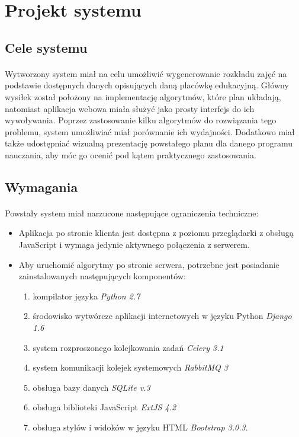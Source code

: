 \section{Projekt systemu}
\author{Filip Czajkowski}
\subsection{Cele systemu}
\paragraph{}Wytworzony system miał na celu umożliwić wygenerowanie rozkładu zajęć na podstawie dostępnych danych opisujących daną placówkę edukacyjną. Główny wysiłek został położony na implementację algorytmów, które plan układają, natomiast aplikacja webowa miała służyć jako prosty interfejs do ich wywoływania. Poprzez zastosowanie kilku algorytmów do rozwiązania tego problemu, system umożliwiać miał porównanie ich wydajności. Dodatkowo miał także udostępniać wizualną prezentację powstałego planu dla danego programu nauczania, aby móc go ocenić pod kątem praktycznego zastosowania.
\subsection{Wymagania}
\paragraph{}Powstały system miał narzucone następujące ograniczenia techniczne:
\begin{itemize}
\item Aplikacja po stronie klienta jest dostępna z poziomu przeglądarki z obsługą JavaScript i wymaga jedynie aktywnego połączenia z serwerem.
\item Aby uruchomić algorytmy po stronie serwera, potrzebne jest posiadanie zainstalowanych następujących komponentów:
\begin{enumerate}
\item kompilator języka \emph{Python 2.7}
\item środowisko wytwórcze aplikacji internetowych w języku Python \emph{Django 1.6}
\item system rozproszonego kolejkowania zadań \emph{Celery 3.1}
\item system komunikacji kolejek systemowych \emph{RabbitMQ 3}
\item obsługa bazy danych \emph{SQLite v.3}
\item obsługa biblioteki JavaScript \emph{ExtJS 4.2}
\item obsługa stylów i widoków w języku HTML \emph{Bootstrap 3.0.3}.
\end{enumerate}
\end{itemize}
